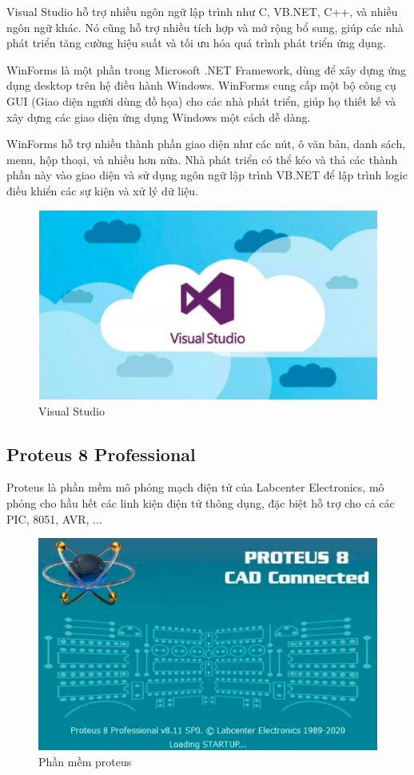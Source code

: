 \documentclass[12pt]{report}
\begin{document}
Visual Studio hỗ trợ nhiều ngôn ngữ lập trình như C, VB.NET, C++, và nhiều ngôn ngữ khác. Nó cũng hỗ trợ nhiều tích hợp và mở rộng bổ sung, giúp các nhà phát triển tăng cường hiệu suất và tối ưu hóa quá trình phát triển ứng dụng.

WinForms là một phần trong Microsoft .NET Framework, dùng để xây dựng ứng dụng desktop trên hệ điều hành Windows. WinForms cung cấp một bộ công cụ GUI (Giao diện người dùng đồ họa) cho các nhà phát triển, giúp họ thiết kế và xây dựng các giao diện ứng dụng Windows một cách dễ dàng.

WinForms hỗ trợ nhiều thành phần giao diện như các nút, ô văn bản, danh sách, menu, hộp thoại, và nhiều hơn nữa. Nhà phát triển có thể kéo và thả các thành phần này vào giao diện và sử dụng ngôn ngữ lập trình VB.NET để lập trình logic điều khiển các sự kiện và xử lý dữ liệu.


    \begin{figure}[H]
        \centering
        \includegraphics[width=0.8\linewidth]{image/visual_studio.png}
        \caption{Visual Studio}
    \end{figure}

\subsection{Proteus 8 Professional}
Proteus là phần mềm mô phỏng mạch điện tử của Labcenter Electronics, mô phỏng cho hầu hết các linh kiện điện tử thông dụng, đặc biệt hỗ trợ cho cả các  PIC, 8051, AVR, ...
    \begin{figure}[H]
        \centering
        \includegraphics[width=0.5\linewidth]{image/proteus.png}
        \caption{Phần mềm proteus}
    \end{figure}
\end{document}
